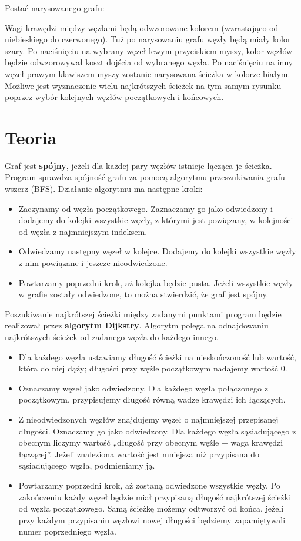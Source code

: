 \documentclass[]{article}
\begin{document}
Postać narysowanego grafu:

Wagi krawędzi między węzłami będą odwzorowane kolorem (wzrastająco od niebieskiego do czerwonego). Tuż po narysowaniu grafu węzły będą miały kolor szary. Po naciśnięciu na wybrany węzeł lewym przyciskiem myszy, kolor węzłów będzie odwzorowywał koszt dojścia od wybranego węzła. Po naciśnięciu na inny węzeł prawym klawiszem myszy zostanie narysowana ścieżka w kolorze białym. Możliwe jest wyznaczenie wielu najkrótszych ścieżek na tym samym rysunku poprzez wybór kolejnych węzłów początkowych i końcowych.


\section{Teoria}\label{header-n279}

Graf jest \textbf{spójny}, jeżeli dla każdej pary węzłów istnieje łącząca je ścieżka. Program sprawdza spójność grafu za pomocą algorytmu przeszukiwania grafu wszerz (BFS). Działanie algorytmu ma następne kroki:
\begin{itemize}
\item
  Zaczynamy od węzła początkowego. Zaznaczamy go jako odwiedzony i dodajemy do kolejki wszystkie węzły, z którymi jest powiązany, w kolejności od węzła z najmniejszym indeksem.
\item
  Odwiedzamy następny węzeł w kolejce. Dodajemy do kolejki wszystkie węzły z nim powiązane i jeszcze nieodwiedzone.
\item
  Powtarzamy poprzedni krok, aż kolejka będzie pusta. Jeżeli wszystkie węzły w grafie zostały odwiedzone, to można stwierdzić, że graf jest spójny.
\end{itemize}

Poszukiwanie najkrótszej ścieżki między zadanymi punktami program będzie realizował przez \textbf{algorytm Dijkstry}. Algorytm polega na odnajdowaniu najkrótszych ścieżek od zadanego węzła do każdego innego. 
\begin{itemize}
\item
  Dla każdego węzła ustawiamy długość ścieżki na nieskończoność lub wartość, która do niej dąży; długości przy węźle początkowym nadajemy wartość 0. 
\item
  Oznaczamy węzeł jako odwiedzony. Dla każdego węzła połączonego z początkowym, przypisujemy długość równą wadze krawędzi ich łączących.
\item
  Z nieodwiedzonych węzłów znajdujemy węzeł o najmniejszej przepisanej długości. Oznaczamy go jako odwiedzony. Dla każdego węzła sąsiadującego z obecnym liczymy wartość „długość przy obecnym węźle + waga krawędzi łączącej”. Jeżeli znaleziona wartość jest mniejsza niż przypisana do sąsiadującego węzła, podmieniamy ją.
\item
  Powtarzamy poprzedni krok, aż zostaną odwiedzone wszystkie węzły. Po zakończeniu każdy węzeł będzie miał przypisaną długość najkrótszej ścieżki od węzła początkowego. Samą ścieżkę możemy odtworzyć od końca, jeżeli przy każdym przypisaniu węzłowi nowej długości będziemy zapamiętywali numer poprzedniego węzła.
\end{itemize}
\end{document}
